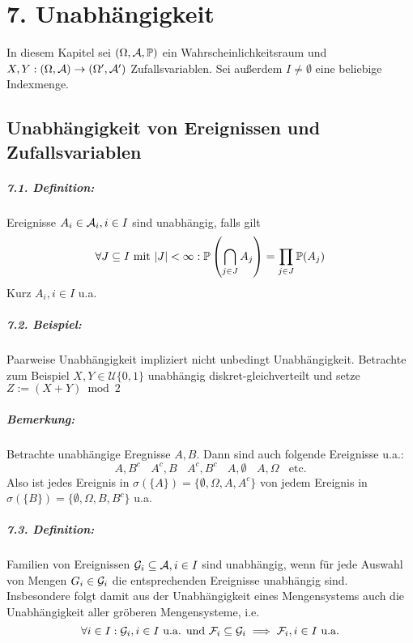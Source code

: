 
\chapter*{7. Unabh\"angigkeit}

In diesem Kapitel sei $(\Omega, \mathcal{A}, \mathbb{P})$ ein Wahrscheinlichkeitsraum und $X,Y:(\Omega,\mathcal{A})\to(\Omega',\mathcal{A}')$ Zufallsvariablen. Sei au\ss{}erdem $I\neq\emptyset$ eine beliebige Indexmenge. 
 
\section*{Unabh\"angigkeit von Ereignissen und Zufallsvariablen}
 
\paragraph{7.1. Definition:}Ereignisse $A_i\in\mathcal{A}_i,i\in I$ sind unabh\"angig, falls gilt
$$\forall J\subseteq I\text{ mit }|J|<\infty:\mathbb{P}\left(\bigcap_{j\in J}A_j\right)=\prod_{j\in J}\mathbb{P}(A_j)$$ 
Kurz $A_i,i\in I$ u.a.

\paragraph{7.2. Beispiel:}Paarweise Unabh\"angigkeit impliziert nicht unbedingt Unabh\"angigkeit. Betrachte zum Beispiel $X,Y\in \mathcal{U}\{0,1\}$ unabh\"angig diskret-gleichverteilt und setze $Z:=(X+Y)\bmod 2$
 
\paragraph{Bemerkung:}Betrachte unabh\"angige Eregnisse $A,B$. Dann sind auch folgende Ereignisse u.a.:
$$A,B^c\ \ \ \ A^c,B\ \ \ \ A^c,B^c\ \ \ \ A,\emptyset\ \ \ \ A,\Omega\ \ \ \ \text{etc.}$$
Also ist jedes Ereignis in $\sigma(\{A\})=\{\emptyset,\Omega,A,A^c\}$ von jedem Ereignis in $\sigma(\{B\})=\{\emptyset,\Omega,B,B^c\}$ u.a.

\paragraph{7.3. Definition:}Familien von Ereignissen $\mathcal{G}_i\subseteq\mathcal{A},i\in I$ sind unabh\"angig, wenn f\"ur jede Auswahl von Mengen $G_i\in\mathcal{G}_i$ die entsprechenden Ereignisse unabh\"angig sind. Insbesondere folgt damit aus der Unabh\"angigkeit eines Mengensystems auch die Unabh\"angigkeit aller gr\"oberen Mengensysteme, i.e.
$$\forall i\in I:\mathcal{G}_i,i\in I\text{ u.a. und }\mathcal{F}_i\subseteq\mathcal{G}_i\implies \mathcal{F}_i,i\in I\text{ u.a.}$$

